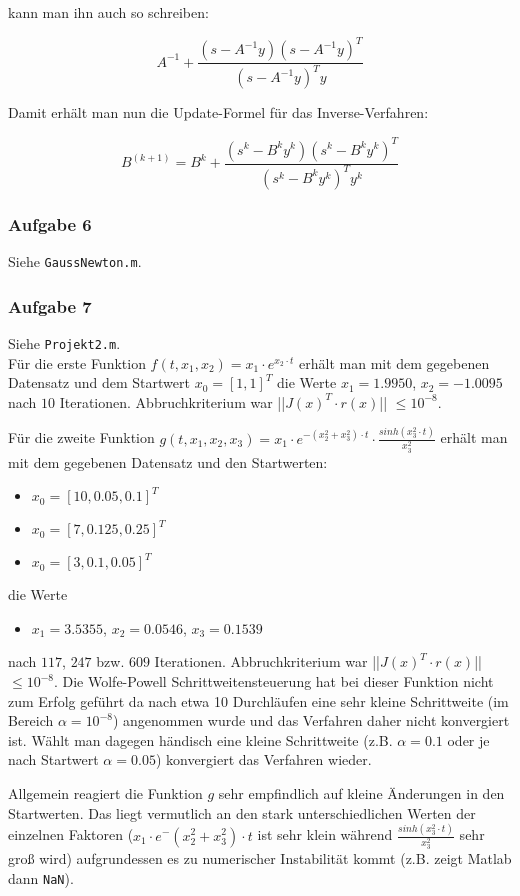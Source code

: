 \documentclass[a4paper, 12pt]{report}
\begin{document}
kann man ihn auch so schreiben:

$$ A^{-1} + \frac{ (s - A^{-1}y )(s - A^{-1}y)^T }{ (s - A^{-1}y)^Ty } $$

Damit erhält man nun die Update-Formel für das Inverse-Verfahren:

$$B^{(k+1)} = B^{k} + \frac{(s^k - B^ky^k)(s^k - B^ky^k)^T}{(s^k-B^ky^k)^Ty^k}$$

\subsubsection{Aufgabe 6}

Siehe \lstinline[basicstyle=\ttfamily\color{black}]|GaussNewton.m|.

\subsubsection{Aufgabe 7}

Siehe \lstinline[basicstyle=\ttfamily\color{black}]|Projekt2.m|.\\
Für die erste Funktion $f(t, x_1, x_2) = x_1\cdot e^{x_2\cdot t}$ erhält man mit dem gegebenen Datensatz und dem
Startwert $x_0 = [1, 1]^T$ die Werte $x_1 = 1.9950$, $x_2 = -1.0095$ nach $10$ Iterationen. Abbruchkriterium war
||$J(x)^T\cdot r(x)$|| $ \leq 10^{-8}$.\par
Für die zweite Funktion $g(t, x_1, x_2, x_3) = x_1 \cdot e^{ -(x_2^2 + x_3^2)\cdot t }\cdot \frac{sinh(x_3^2\cdot t)}{x_3^2}$
erhält man mit dem gegebenen Datensatz und den Startwerten:
\begin{itemize}
  \item $x_0 = [10, 0.05, 0.1]^T$
  \item $x_0 = [7, 0.125, 0.25]^T$
  \item $x_0 = [3, 0.1, 0.05]^T$
\end{itemize}
die Werte
\begin{itemize}
  \item $x_1 = 3.5355$, $x_2 = 0.0546$, $x_3 = 0.1539$
\end{itemize}
nach $117$, $247$ bzw. $609$ Iterationen. Abbruchkriterium war ||$J(x)^T\cdot r(x)$|| $ \leq 10^{-8}$. Die Wolfe-Powell
Schrittweitensteuerung hat bei dieser Funktion nicht zum Erfolg geführt da nach etwa 10 Durchläufen eine sehr kleine
Schrittweite (im Bereich $\alpha = 10^{-8}$) angenommen wurde und das Verfahren daher nicht konvergiert ist. Wählt
man dagegen händisch eine kleine Schrittweite (z.B. $\alpha = 0.1$ oder je nach Startwert $\alpha = 0.05$) konvergiert das
Verfahren wieder.\par
Allgemein reagiert die Funktion $g$ sehr empfindlich auf kleine Änderungen in den Startwerten. Das liegt vermutlich an den
stark unterschiedlichen Werten der einzelnen Faktoren ($x_1\cdot e^-{ (x_2^2 + x_3^2)\cdot t}$ ist sehr klein während
$\frac{sinh(x_3^2\cdot t)}{x_3^2}$ sehr groß wird) aufgrundessen es zu numerischer Instabilität kommt (z.B. zeigt Matlab
dann \lstinline[basicstyle=\ttfamily\color{black}]|NaN|).
\end{document}
